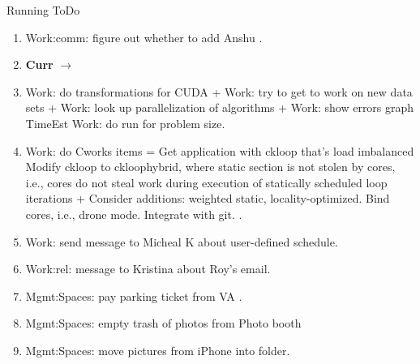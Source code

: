 \begin{columns}
\begin{column}{0.5\linewidth}
      \begin{block}{Running ToDo} %
        \begin{enumerate}          
           
           
           
             . 

        \item \tiny Work:comm: figure out whether to add Anshu . 

          \tiny \item \tiny \textbf{Curr} $\rightarrow$

        \item \tiny Work: do transformations for CUDA + Work: try to
          get to work on new data sets + Work: look up parallelization
          of algorithms + Work: show errors  graph TimeEst 
          Work: do run for problem size. 
       

        \item \tiny Work: do Cworks items = Get application with
          ckloop that’s load imbalanced Modify ckloop to ckloophybrid, where
          static section is not stolen by cores, i.e., cores do not steal
          work during execution of statically scheduled loop iterations +
          Consider additions: weighted static, locality-optimized. Bind
          cores, i.e., drone mode. Integrate with git.  
           .
 
        \item \tiny Work: send message to Micheal K about user-defined
          schedule. 

        \item \tiny Work:rel: message to Kristina about Roy's
          email.   

        \item \tiny Mgmt:Spaces: pay parking ticket from VA 
          . 

          
  
        \item \tiny Mgmt:Spaces: empty trash of photos from Photo booth 
        \item \tiny Mgmt:Spaces: move pictures from iPhone into
          folder.  


\end{enumerate}
\end{block}
\end{column}
\end{columns}
